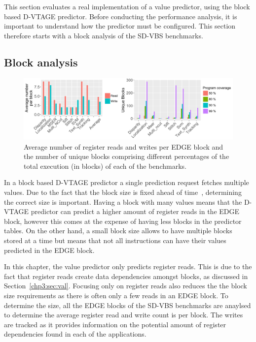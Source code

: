 This section evaluates a real implementation of a value predictor, using the block based D-VTAGE predictor.
Before conducting the performance analysis, it is important to understand how the predictor must be configured.
This section therefore starts with a block analysis of the SD-VBS benchmarks.

\subsection{Block analysis}
\begin{figure}[t]
    \centering
    \includegraphics[width=1\textwidth]{chapter3/graphics/joint.pdf}

    \caption{Average number of register reads and writes per EDGE block and the number of unique blocks comprising different percentages of the total execution (in blocks) of each of the benchmarks.}
    \label{fig:edge_reg_read}
	\vspace{1em}
\end{figure}

In a block based D-VTAGE predictor a single prediction request fetches multiple values.
Due to the fact that the block size is fixed ahead of time~\cite{peraisBeBop2015}, determining the correct size is important.
Having a block with many values means that the D-VTAGE predictor can predict a higher amount of register reads in the EDGE block, however this comes at the expense of having less blocks in the predictor tables.
On the other hand, a small block size allows to have multiple blocks stored at a time but means that not all instructions can have their values predicted in the EDGE block.

In this chapter, the value predictor only predicts register reads.
This is due to the fact that register reads create data dependencies amongst blocks, as discussed in Section~\ref{chp3:sec:val}.
Focusing only on register reads also reduces the the block size requirements as there is often only a few reads in an EDGE block.
To determine the size, all the EDGE blocks of the SD-VBS benchmarks are anaylsed to determine the average register read and write count is per block.
The writes are tracked as it provides information on the potential amount of register dependencies found in each of the applications.


